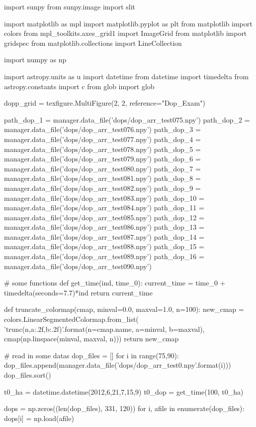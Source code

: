 \documentclass{emulateapj}
\begin{document}
\begin{pycode}[doppler]
import sunpy
from sunpy.image import slit

import matplotlib as mpl
import matplotlib.pyplot as plt
from matplotlib import colors
from mpl_toolkits.axes_grid1 import ImageGrid
from matplotlib import gridspec
from matplotlib.collections import LineCollection

import numpy as np

import astropy.units as u
import datetime
from datetime import timedelta
from astropy.constants import c
from glob import glob

dopp_grid = texfigure.MultiFigure(2, 2, reference="Dop_Exam")

path_dop_1 = manager.data_file('dops/dop_arr_test075.npy')
path_dop_2 = manager.data_file('dops/dop_arr_test076.npy')
path_dop_3 = manager.data_file('dops/dop_arr_test077.npy')
path_dop_4 = manager.data_file('dops/dop_arr_test078.npy')
path_dop_5 = manager.data_file('dops/dop_arr_test079.npy')
path_dop_6 = manager.data_file('dops/dop_arr_test080.npy')
path_dop_7 = manager.data_file('dops/dop_arr_test081.npy')
path_dop_8 = manager.data_file('dops/dop_arr_test082.npy')
path_dop_9 = manager.data_file('dops/dop_arr_test083.npy')
path_dop_10 = manager.data_file('dops/dop_arr_test084.npy')
path_dop_11 = manager.data_file('dops/dop_arr_test085.npy')
path_dop_12 = manager.data_file('dops/dop_arr_test086.npy')
path_dop_13 = manager.data_file('dops/dop_arr_test087.npy')
path_dop_14 = manager.data_file('dops/dop_arr_test088.npy')
path_dop_15 = manager.data_file('dops/dop_arr_test089.npy')
path_dop_16 = manager.data_file('dops/dop_arr_test090.npy')

# some functions
def get_time(ind, time_0):
    current_time = time_0 + timedelta(seconds=7.7)*ind
    return current_time

def truncate_colormap(cmap, minval=0.0, maxval=1.0, n=100):
    new_cmap = colors.LinearSegmentedColormap.from_list(
        'trunc({n},{a:.2f},{b:.2f})'.format(n=cmap.name, a=minval, b=maxval),
        cmap(np.linspace(minval, maxval, n)))
    return new_cmap

# read in some datas
dop_files = []
for i in range(75,90):
	dop_files.append(manager.data_file('dops/dop_arr_test0{}.npy'.format(i)))
dop_files.sort()

t0_ha = datetime.datetime(2012,6,21,7,15,9)
t0_dop = get_time(100, t0_ha)

dops = np.zeros((len(dop_files), 331, 120))
for i, afile in enumerate(dop_files):
    dops[i] = np.load(afile)


\end{pycode}
\end{document}
